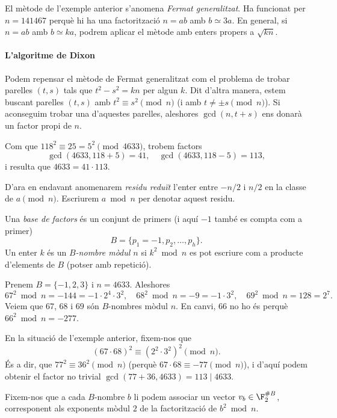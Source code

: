  El mètode de l'exemple anterior s'anomena \emph{Fermat generalitzat}. Ha funcionat per $n=141467$ perquè hi ha una factorització $n=ab$ amb $b\simeq 3a$. En general, si $n=ab$ amb $b\simeq ka$, podrem aplicar el mètode amb enters propers a $\sqrt{kn}$.
 
 \paragraph{L'algoritme de Dixon}
 Podem repensar el mètode de Fermat generalitzat com el problema de trobar parelles $(t,s)$ tals que $t^2-s^2=kn$ per algun $k$. Dit d'altra manera, estem buscant parelles $(t,s)$ amb $t^2\equiv s^2\pmod n$ (i amb $t\neq \pm s\pmod n$). Si aconseguim trobar una d'aquestes parelles, aleshores $\gcd(n,t+s)$ ens donarà un factor propi de $n$.
 
 \begin{example}
  Com que $118^2\equiv 25=5^2\pmod{4633}$, trobem factors
  \[
  \gcd(4633,118+5) = 41,\quad \gcd(4633,118-5) = 113,
  \]
  i resulta que $4633=41\cdot 113$.
 \end{example}
 
 D'ara en endavant anomenarem \emph{residu reduït} l'enter entre $-n/2$ i $n/2$ en la classe de $a\pmod{n}$. Escriurem $a\bmod n$ per denotar aquest residu.
 
 \begin{definition}
 Una \emph{base de factors} és un conjunt de primers (i aquí $-1$ també es compta com a primer)
 \[
 B=\{p_1=-1, p_2,\ldots, p_h\}.
 \]
 Un enter $k$ és un \emph{$B$-nombre mòdul $n$} si $k^2\bmod n$ es pot escriure com a producte d'elements de $B$ (potser amb repetició).
 \end{definition}
 
 \begin{example}
  Prenem $B=\{-1,2,3\}$ i $n=4633$. Aleshores
  \[
  67^2\bmod n = -144=-1\cdot 2^4\cdot 3^2,\quad 68^2\bmod n = -9=-1\cdot 3^2,\quad 69^2\bmod n = 128=2^7.
  \]
  Veiem que $67$, $68$ i $69$ són $B$-nombres mòdul $n$. En canvi, $66$ no ho és perquè $66^2\bmod n=-277$.
 \end{example}
 
 En la situació de l'exemple anterior, fixem-nos que
 \[
 (67\cdot 68)^2\equiv (2^2\cdot 3^2)^2\pmod n.
 \]
 És a dir, que $77^2\equiv 36^2\pmod n$ (perquè $67\cdot 68\equiv -77\pmod{n}$), i d'aquí podem obtenir el factor no trivial $\gcd(77+36,4633) = 113 \mid 4633$.
 
 
 Fixem-nos que a cada $B$-nombre $b$ li podem associar un vector $v_b\in \F_2^{\# B}$, corresponent als exponents mòdul $2$ de la factorització de $b^2\bmod n$.
 
